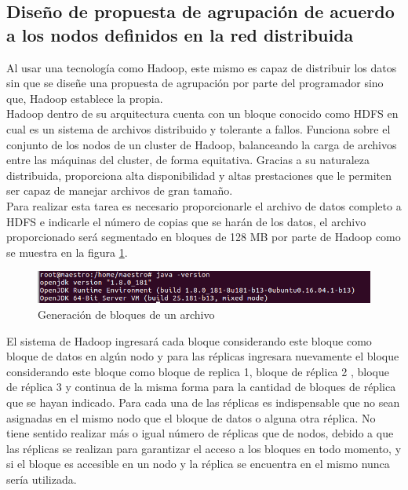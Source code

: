\subsection{Diseño de propuesta de agrupación de acuerdo a los nodos definidos en la red distribuida}

Al usar una tecnología como Hadoop, este mismo es capaz de distribuir los datos sin que se diseñe una
propuesta de agrupación por parte del programador sino que, Hadoop establece la propia.
\\
Hadoop dentro de su arquitectura cuenta con un bloque conocido como HDFS en cual es un sistema de archivos distribuido y tolerante a fallos. Funciona sobre el conjunto de los nodos
de un cluster de Hadoop, balanceando la carga de archivos entre las máquinas del cluster,
de forma equitativa. Gracias a su naturaleza distribuida, proporciona alta disponibilidad y
altas prestaciones que le permiten ser capaz de manejar archivos de gran tamaño.
\\
Para realizar esta tarea es necesario proporcionarle el archivo de datos completo a HDFS e indicarle el número de copias que se harán de los datos,  el archivo proporcionado será segmentado en bloques de 128 MB por parte de Hadoop como se muestra en la figura \ref{fig:red2}.
\begin{figure}[!htbp]
	\hypertarget{fig:red2}{\hspace{1pt}}
	\begin{center}
		\includegraphics[width=.4\textwidth]{capitulo3/images/im2.png}
		\caption{Generación de bloques de un archivo}
		\label{fig:red2}
	\end{center}
\end{figure}
\newpage
El sistema de Hadoop ingresará cada bloque considerando este bloque como bloque de
datos en algún nodo y para las réplicas ingresara nuevamente el bloque considerando este
bloque como bloque de replica 1, bloque de réplica 2 , bloque de réplica 3 y continua de la
misma forma para la cantidad de bloques de réplica que se hayan indicado. Para cada una
de las réplicas es indispensable que no sean asignadas en el mismo nodo que el bloque de
datos o alguna otra réplica. No tiene sentido realizar más o igual número de réplicas que de
nodos, debido a que las réplicas se realizan para garantizar el acceso a los bloques en todo
momento, y si el bloque es accesible en un nodo y la réplica se encuentra en el mismo
nunca sería utilizada.
